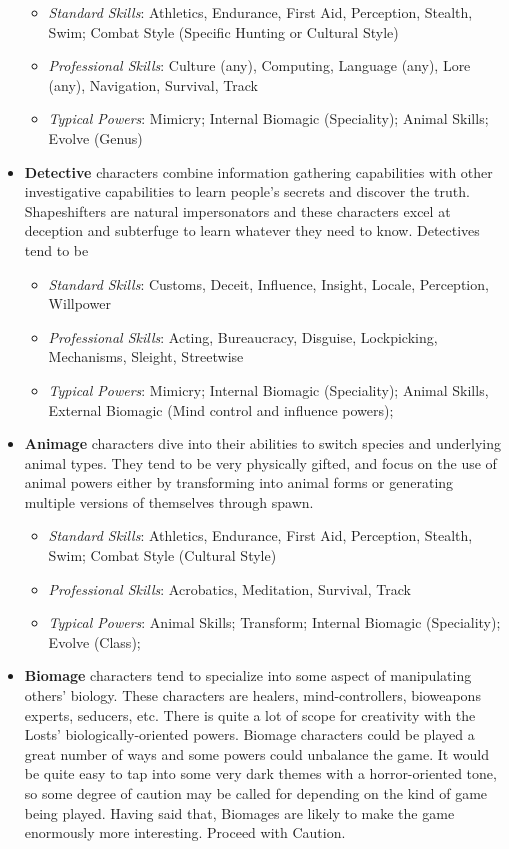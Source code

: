 \documentclass[letterpaper,serif]{rpg-module}
\begin{document}
\begin{itemize}
    \begin{itemize}
        \item \emph{Standard Skills}: Athletics, Endurance, First Aid, Perception, Stealth, Swim; Combat Style (Specific Hunting or Cultural Style)
        \item \emph{Professional Skills}: Culture (any), Computing, Language (any), Lore (any), Navigation, Survival, Track
        \item \emph{Typical Powers}: Mimicry; Internal Biomagic (Speciality); Animal Skills; Evolve (Genus)
    \end{itemize}
    \item \textbf{Detective} characters combine information gathering capabilities with other investigative capabilities to learn people's secrets and discover the truth. Shapeshifters are natural impersonators and these characters excel at deception and subterfuge to learn whatever they need to know. Detectives tend to be 
    \begin{itemize}
        \item \emph{Standard Skills}: Customs, Deceit, Influence, Insight, Locale, Perception, Willpower
        \item \emph{Professional Skills}: Acting, Bureaucracy, Disguise, Lockpicking, Mechanisms, Sleight, Streetwise 
        \item \emph{Typical Powers}: Mimicry; Internal Biomagic (Speciality); Animal Skills, External Biomagic (Mind control and influence powers); 
    \end{itemize}
    \item \textbf{Animage} characters dive into their abilities to switch species and underlying animal types. They tend to be very physically gifted, and focus on the use of animal powers either by transforming into animal forms or generating multiple versions of themselves through spawn.   
    \begin{itemize}
        \item \emph{Standard Skills}:  Athletics, Endurance, First Aid, Perception, Stealth, Swim; Combat Style (Cultural Style)
        \item \emph{Professional Skills}: Acrobatics, Meditation, Survival, Track 
        \item \emph{Typical Powers}: Animal Skills; Transform; Internal Biomagic (Speciality); Evolve (Class); 
    \end{itemize}
    \item \textbf{Biomage} characters tend to specialize into some aspect of manipulating others' biology. These characters are healers, mind-controllers, bioweapons experts, seducers, etc. There is quite a lot of scope for creativity with the Losts' biologically-oriented powers. Biomage characters could be played a great number of ways and some powers could unbalance the game. It would be quite easy to tap into some very dark themes with a horror-oriented tone, so some degree of caution may be called for depending on the kind of game being played. Having said that, Biomages are likely to make the game enormously more interesting. Proceed with Caution. 

\end{itemize}
\end{document}

